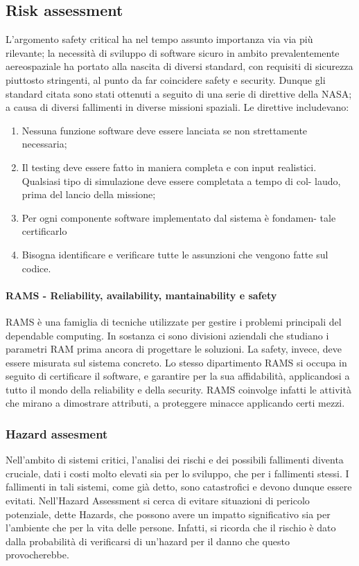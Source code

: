 \documentclass{article}
\begin{document}
\subsection{Risk assessment}
L’argomento safety critical ha nel tempo assunto importanza via via più rilevante; la 
necessità di sviluppo di software sicuro in ambito prevalentemente aereospaziale ha portato
alla nascita di diversi standard, con requisiti di sicurezza piuttosto stringenti, al punto 
da far coincidere safety e security. Dunque gli standard citata sono stati ottenuti a seguito
di una serie di direttive della NASA; a causa di diversi fallimenti in diverse missioni
spaziali. Le direttive includevano:

\begin{enumerate}
  \item Nessuna funzione software deve essere lanciata se non strettamente
    necessaria;
  \item Il testing deve essere fatto in maniera completa e con input realistici.
    Qualsiasi tipo di simulazione deve essere completata a tempo di col-
    laudo, prima del lancio della missione;
  \item Per ogni componente software implementato dal sistema è fondamen-
    tale certificarlo
  \item Bisogna identificare e verificare tutte le assunzioni che vengono fatte
    sul codice.
\end{enumerate}

\paragraph{RAMS - Reliability, availability, mantainability e safety} RAMS è una famiglia 
di tecniche utilizzate per gestire i problemi principali del dependable computing. In 
sostanza ci sono divisioni aziendali che studiano i parametri RAM prima ancora di progettare
le soluzioni. La safety, invece, deve essere misurata sul sistema concreto. Lo stesso
dipartimento RAMS si occupa in seguito di certificare il software, e garantire per la sua
affidabilità, applicandosi a tutto il mondo della reliability e della security. 
RAMS coinvolge infatti le attività che mirano a dimostrare attributi, a proteggere minacce
applicando certi mezzi.

\subsubsection{Hazard assesment}
Nell’ambito di sistemi critici, l’analisi dei rischi e dei possibili fallimenti diventa
cruciale, dati i costi molto elevati sia per lo sviluppo, che per i fallimenti stessi. I 
fallimenti in tali sistemi, come già detto, sono catastrofici e devono dunque essere evitati. 
Nell’Hazard Assessment si cerca di evitare situazioni di pericolo potenziale,
dette Hazards, che possono avere un impatto significativo sia per l’ambiente che per la
vita delle persone. Infatti, si ricorda che il rischio è dato dalla probabilità di 
verificarsi di un'hazard per il danno che questo provocherebbe.
\end{document}

